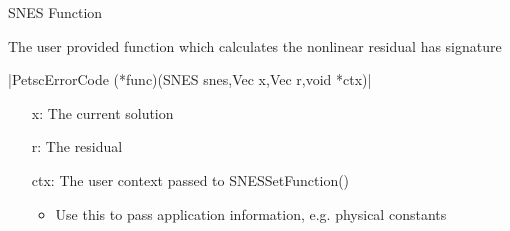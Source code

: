 \begin{frame}{SNES Function}

The user provided function which calculates the nonlinear residual has signature
\begin{center}
  {\small {}|PetscErrorCode (*func)(SNES snes,Vec x,Vec r,void *ctx)|}
\end{center}
\begin{itemize}
  \item[{\kb x}:] The current solution
  \item[{\kb r}:] The residual
  \item[{\kb ctx}:] The user context passed to {\kb SNESSetFunction()}
  \begin{itemize}
    \item Use this to pass application information, e.g. physical constants
  \end{itemize}
\end{itemize}

\end{frame}
